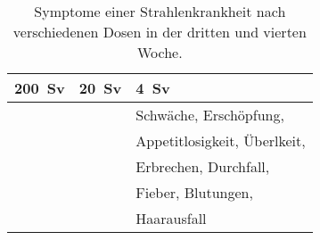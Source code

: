\begin{table}
	\caption{Symptome einer Strahlenkrankheit nach verschiedenen Dosen in der dritten und vierten Woche.\cite{AnnuRev18_2}}
		\begin{tabular}{lll}
			\toprule
	 		\SI{200}{\sievert} & \SI{20}{\sievert}& \SI{4}{\sievert}\\
			\midrule
			\phantom{Hautrötung, Desorientierung,} & & Schwäche, Erschöpfung, \\
			&\phantom{Hautrötung, Desorientierung,}  & Appetitlosigkeit, Überlkeit,\\
			& & Erbrechen, Durchfall,\\
			& & Fieber, Blutungen, \\
			& & Haarausfall
		\end{tabular}

\end{table}
